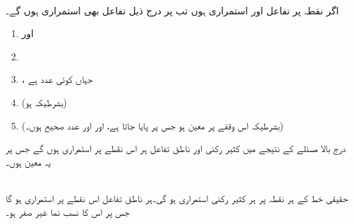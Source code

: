 \\
اگر نقطہ  پر تفاعل  اور  استمراری ہوں تب  پر درج ذیل تفاعل بھی استمراری ہوں گے۔
\begin{enumerate}[1.]
\item
{} اور 
\item
{}
\item
{}، جہاں  کوئی عدد ہے
\item
{} (بشرطیکہ  ہو)
\item
{} (بشرطیکہ  اس وقفے پر معین ہو جس پر  پایا جاتا ہے، اور   اور  عدد صحیح ہوں۔)
\end{enumerate}

درج بالا مسئلے کے نتیجے میں کثیر رکنی اور ناطق تفاعل ہر اس نقطے پر استمراری ہوں گے جس پر یہ معین ہوں۔

\\
حقیقی خط کے ہر نقطہ پر ہر کثیر رکنی استمراری ہو گی۔ہر ناطق تفاعل اس نقطے پر استمراری ہو گا جس پر اس کا نسب نما غیر صفر ہو۔ 

